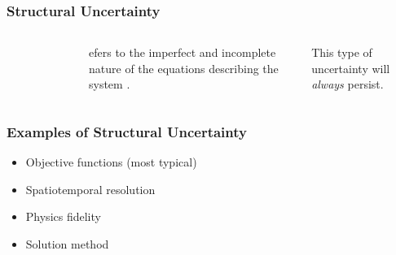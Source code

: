 \begin{frame}
    \frametitle{Structural Uncertainty}

    \begin{columns}
        \column[t]{4cm}
        \begin{figure}
            \centering
        \end{figure}

        \column[t]{6cm}
        \begin{definition}efers to the imperfect and incomplete nature of the equations describing the system \cite{decarolis_using_2011}.
        \end{definition}
        
        This type of uncertainty will \textit{always} persist.
    \end{columns}

\end{frame}

\begin{frame}
    \frametitle{Examples of Structural Uncertainty}

    \begin{itemize}
        \item Objective functions (most typical)\pause
        \item Spatiotemporal resolution\pause
        \item Physics fidelity\pause
        \item Solution method
    \end{itemize}

\end{frame}

